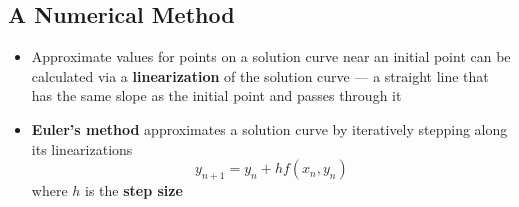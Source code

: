 \documentclass{article}
\begin{document}
\subsection{A Numerical Method}

\begin{itemize}
  \item Approximate values for points on a solution curve near an initial point can be calculated via a \textbf{linearization} of the solution curve — a straight line that has the same slope as the initial point and passes through it

  \item \textbf{Euler's method} approximates a solution curve by iteratively stepping along its linearizations \[y_{n + 1} = y_n + h f(x_n, y_n)\] where $h$ is the \textbf{step size}
\end{itemize}
\end{document}
